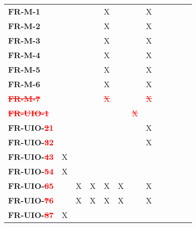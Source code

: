 \documentclass[12pt, titlepage]{article}
\begin{document}
\begin{table}[H]
\begin{adjustbox}{max width=0.7\paperwidth}
\begin{tabular}{l|ccccccccccc}
        \textbf{FR-M-1}    & ~ & ~ & ~ & X & ~ & ~ & X & ~\\
        \textbf{FR-M-2}    & ~ & ~ & ~ & X & ~ & ~ & X & ~\\
        \textbf{FR-M-3}    & ~ & ~ & ~ & X & ~ & ~ & X & ~\\
        \textbf{FR-M-4}    & ~ & ~ & ~ & X & ~ & ~ & X & ~\\
        \textbf{FR-M-5}    & ~ & ~ & ~ & X & ~ & ~ & X & ~\\
        \textbf{FR-M-6}    & ~ & ~ & ~ & X & ~ & ~ & X & ~\\
        \textbf{\textcolor{red}{\sout{FR-M-7}}}    & ~ & ~ & ~ & \textcolor{red}{\sout{X}} & ~ & ~ & \textcolor{red}{\sout{X}} & ~\\
        \textcolor{red}{\sout{\textbf{FR-UIO-1}}}  & ~ & ~ & ~ & ~ & ~ & \textcolor{red}{\sout{X}} & ~ & ~\\
        \textbf{FR-UIO-\textcolor{red}{\sout{2}1}}  & ~ & ~ & ~ & ~ & ~ & ~ & X & ~\\
        \textbf{FR-UIO-\textcolor{red}{\sout{3}2}}  & ~ & ~ & ~ & ~ & ~ & ~ & X & ~\\
        \textbf{FR-UIO-\textcolor{red}{\sout{4}3}}  & X & ~ & ~ & ~ & ~ & ~ & ~ & ~\\
        \textbf{FR-UIO-\textcolor{red}{\sout{5}4}}  & X & ~ & ~ & ~ & ~ & ~ & ~ & ~\\
        \textbf{FR-UIO-\textcolor{red}{\sout{6}5}}  & ~ & X & X & X & X & ~ & X & ~\\
        \textbf{FR-UIO-\textcolor{red}{\sout{7}6}}  & ~ & X & X & X & X & ~ & X & ~\\
        \textbf{FR-UIO-\textcolor{red}{\sout{8}7}}  & X & ~ & ~ & ~ & ~ & ~ & ~ & ~\\
    \end{tabular}
    \end{adjustbox}
\end{table}
\end{document}
